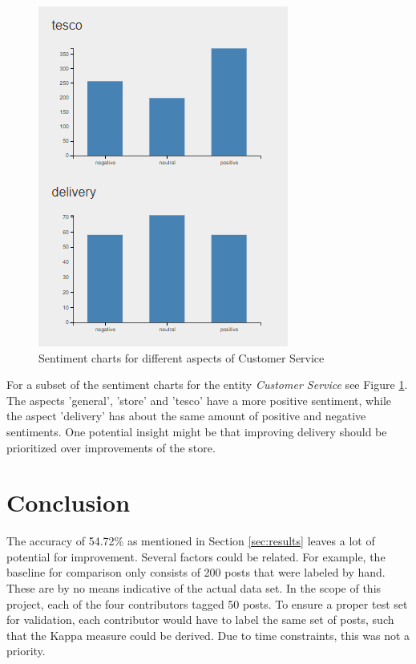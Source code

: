 \documentclass[10pt,a4paper]{article}
\begin{document}
\begin{figure}[!h]
\begin{minipage}[b]{0.48\textwidth}
		    \includegraphics[width=\textwidth]{data/custService2}
		  \end{minipage}
		  \caption{Sentiment charts for different aspects of Customer Service}
		  \label{fig:custServ}
		\end{figure}		
		
		For a subset of the sentiment charts for the entity \textit{Customer Service} see Figure \ref{fig:custServ}. The aspects 'general', 'store' and 'tesco' have a more positive sentiment, while the aspect 'delivery' has about the same amount of positive and negative sentiments. One potential insight might be that improving delivery should be prioritized over improvements of the store.
	
	\section{Conclusion}
	The accuracy of 54.72\% as mentioned in Section \ref{sec:results} leaves a lot of potential for improvement. Several factors could be related. For example, the baseline for comparison only consists of 200 posts that were labeled by hand. These are by no means indicative of the actual data set. In the scope of this project, each of the four contributors tagged 50 posts. To ensure a proper test set for validation, each contributor would have to label the same set of posts, such that the Kappa measure could be derived. Due to time constraints, this was not a priority.
\end{document}
